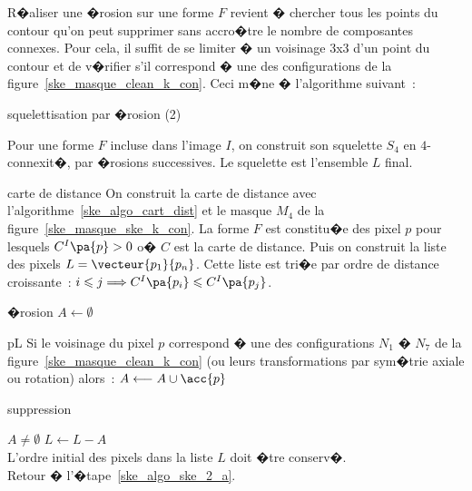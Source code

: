 
R�aliser une �rosion sur une forme $F$ revient � chercher tous les points du contour qu'on peut supprimer sans accro�tre le nombre de composantes connexes. Pour cela, il suffit de se limiter � un voisinage 3x3 d'un point du contour et de v�rifier s'il correspond � une des configurations de la figure~\ref{ske_masque_clean_k_con}. Ceci m�ne � l'algorithme suivant~:


            

        \begin{xalgorithm}{squelettisation par �rosion (2)}
        \label{ske_algo_ske_ero_algo_2}
        
        Pour une forme $F$ incluse dans l'image $I$, on construit son squelette $S_4$ en $4$-connexit�, 
        par �rosions successives. Le squelette est l'ensemble $L$ final.
        
        \begin{xalgostep}{carte de distance}
                On construit la carte de distance avec l'algorithme~\ref{ske_algo_cart_dist} et le masque $M_4$ de la
                figure~\ref{ske_masque_ske_k_con}. La forme $F$ est constitu�e des pixel $p$ 
                pour lesquels $C^I\pa{p} > 0$ o� 
                $C$ est la carte de distance. Puis on construit la liste des pixels $L=\vecteur{p_1}{p_n}$. 
                Cette liste est tri�e 
                par ordre de distance croissante~: $i \leqslant j \Longrightarrow C^I\pa{p_i} \leqslant C^I\pa{p_j}$.
        \end{xalgostep}
        
        \begin{xalgostep}{�rosion}\label{ske_algo_ske_2_a}
                $A \longleftarrow \emptyset$ \\
                \begin{xforeach}{p}{L}
                Si le voisinage du pixel $p$ correspond � une des configurations $N_1$ � $N_7$ de la 
                figure~\ref{ske_masque_clean_k_con} (ou leurs transformations par sym�trie axiale ou rotation) alors~: 
                $A \longleftarrow A \cup \acc{p}$
                \end{xforeach}
        \end{xalgostep}
        
        \begin{xalgostep}{suppression}
                \begin{xif}{$A \neq \emptyset$}
                    $L \longleftarrow L - A$ \\
                    L'ordre initial des pixels dans la liste $L$ doit �tre conserv�. \\
                    Retour � l'�tape~\ref{ske_algo_ske_2_a}.
                \end{xif}        
        \end{xalgostep}
                
        
        \end{xalgorithm}





